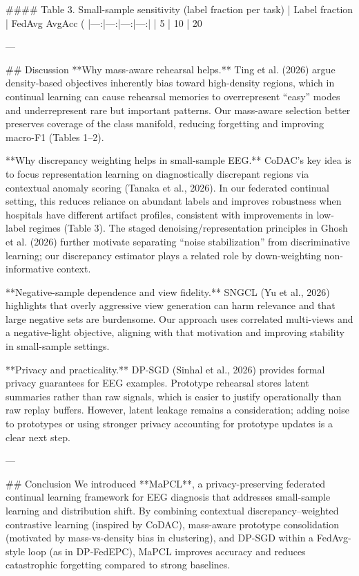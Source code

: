 #### Table 3. Small-sample sensitivity (label fraction per task)  
| Label fraction | FedAvg AvgAcc (%
|---:|---:|---:|---:|
| 5%
| 10%
| 20%

---

## Discussion  
**Why mass-aware rehearsal helps.** Ting et al. (2026) argue density-based objectives inherently bias toward high-density regions, which in continual learning can cause rehearsal memories to overrepresent “easy” modes and underrepresent rare but important patterns. Our mass-aware selection better preserves coverage of the class manifold, reducing forgetting and improving macro-F1 (Tables 1–2).

**Why discrepancy weighting helps in small-sample EEG.** CoDAC’s key idea is to focus representation learning on diagnostically discrepant regions via contextual anomaly scoring (Tanaka et al., 2026). In our federated continual setting, this reduces reliance on abundant labels and improves robustness when hospitals have different artifact profiles, consistent with improvements in low-label regimes (Table 3). The staged denoising/representation principles in Ghosh et al. (2026) further motivate separating “noise stabilization” from discriminative learning; our discrepancy estimator plays a related role by down-weighting non-informative context.

**Negative-sample dependence and view fidelity.** SNGCL (Yu et al., 2026) highlights that overly aggressive view generation can harm relevance and that large negative sets are burdensome. Our approach uses correlated multi-views and a negative-light objective, aligning with that motivation and improving stability in small-sample settings.

**Privacy and practicality.** DP-SGD (Sinhal et al., 2026) provides formal privacy guarantees for EEG examples. Prototype rehearsal stores latent summaries rather than raw signals, which is easier to justify operationally than raw replay buffers. However, latent leakage remains a consideration; adding noise to prototypes or using stronger privacy accounting for prototype updates is a clear next step.

---

## Conclusion  
We introduced **MaPCL**, a privacy-preserving federated continual learning framework for EEG diagnosis that addresses small-sample learning and distribution shift. By combining contextual discrepancy–weighted contrastive learning (inspired by CoDAC), mass-aware prototype consolidation (motivated by mass-vs-density bias in clustering), and DP-SGD within a FedAvg-style loop (as in DP-FedEPC), MaPCL improves accuracy and reduces catastrophic forgetting compared to strong baselines.

